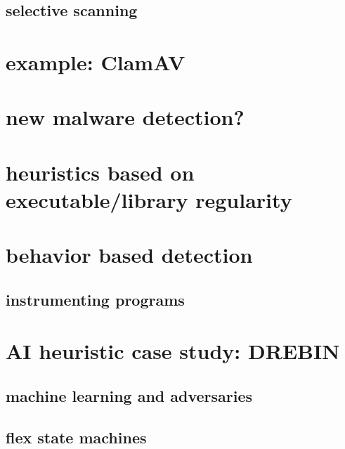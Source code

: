 \subsection{selective scanning}


\section{example: ClamAV}


\section{new malware detection?}


\section{heuristics based on executable/library regularity}


\section{behavior based detection}


\subsection{instrumenting programs}


\section{AI heuristic case study: DREBIN}


\subsection{machine learning and adversaries}


\subsection{flex state machines}




